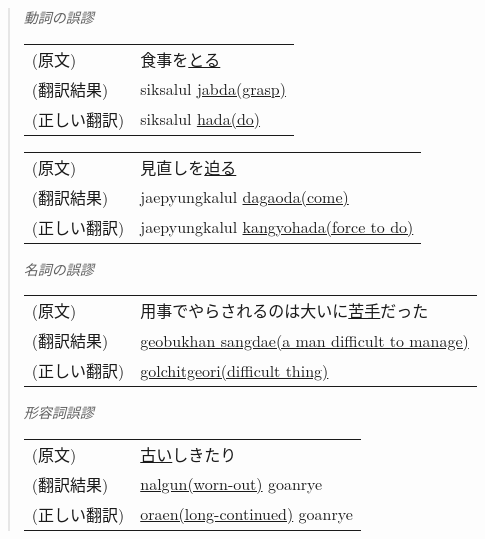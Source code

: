 \begin{quote}

{\it 動詞の誤謬}

\vspace{0.5cm}

\begin{tabular}{ll}
 (原文)     &  食事を\underline{とる} \\
 (翻訳結果) &  siksalul \underline{jabda(grasp)} \\
 (正しい翻訳) & siksalul \underline{hada(do)} \\
\end{tabular}

\vspace{0.5cm}

\begin{tabular}{ll}
 (原文)      & 見直しを\underline{迫る} \\
 (翻訳結果)  & jaepyungkalul \underline{dagaoda(come)} \\
 (正しい翻訳)& jaepyungkalul \underline{kangyohada(force to do)} \\
\end{tabular}

\vspace{0.5cm}

\begin{flushleft}
{\it 名詞の誤謬}
\end{flushleft}

\begin{tabular}{ll}
  (原文)      & 用事でやらされるのは大いに\underline{苦手}だった \\
  (翻訳結果)  & \underline{geobukhan sangdae(a man difficult to manage)} \\
  (正しい翻訳)& \underline{golchitgeori(difficult thing)} \\
\end{tabular}

\vspace{0.5cm}

\begin{flushleft}
{\it 形容詞誤謬}
\end{flushleft}

\begin{tabular}{ll}
  (原文)      & \underline{古い}しきたり \\
  (翻訳結果)  & \underline{nalgun(worn-out)} goanrye \\
  (正しい翻訳)& \underline{oraen(long-continued)} goanrye \\
\end{tabular}


\end{quote}
